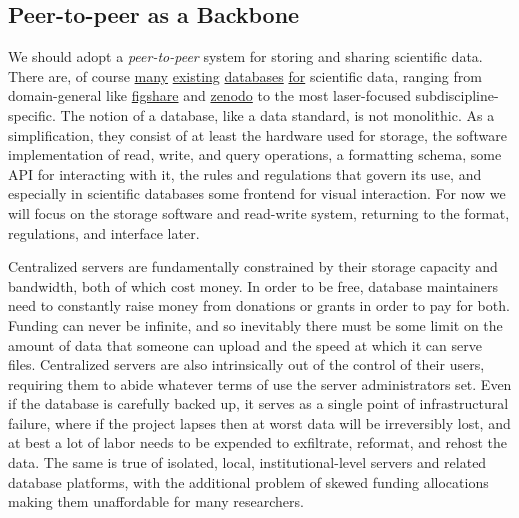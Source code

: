 \hypertarget{peer-to-peer-as-a-backbone}{%
\subsection{Peer-to-peer as a
Backbone}\label{peer-to-peer-as-a-backbone}}

We should adopt a \emph{peer-to-peer} system for storing and sharing
scientific data. There are, of course
\href{https://www.dandiarchive.org/}{many}
\href{https://openneuro.org/}{existing}
\href{https://www.brainminds.riken.jp/}{databases}
\href{https://biccn.org/}{for} scientific data, ranging from
domain-general like \href{https://figshare.com/}{figshare} and
\href{https://zenodo.org/}{zenodo} to the most laser-focused
subdiscipline-specific. The notion of a database, like a data standard,
is not monolithic. As a simplification, they consist of at least the
hardware used for storage, the software implementation of read, write,
and query operations, a formatting schema, some API for interacting with
it, the rules and regulations that govern its use, and especially in
scientific databases some frontend for visual interaction. For now we
will focus on the storage software and read-write system, returning to
the format, regulations, and interface later.

Centralized servers
are fundamentally constrained by their storage capacity and bandwidth,
both of which cost money. In order to be free, database maintainers need
to constantly raise money from donations or grants in order to pay for
both. Funding can never be infinite, and so inevitably there must be
some limit on the amount of data that someone can upload and the speed
at which it can serve files. Centralized servers
are also intrinsically out of the control of their users, requiring them
to abide whatever terms of use the server administrators set. Even if
the database is carefully backed up, it serves as a single point of
infrastructural failure, where if the project lapses then at worst data
will be irreversibly lost, and at best a lot of labor needs to be
expended to exfiltrate, reformat, and rehost the data. The same is true
of isolated, local, institutional-level servers and related database
platforms, with the additional problem of skewed funding allocations
making them unaffordable for many researchers.


